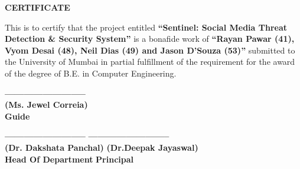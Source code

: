 \newpage
\thispagestyle{plain}
\begin{center}
\textbf {{ \Large CERTIFICATE }} \\
\vspace{2pc}
\end{center}
\doublespacing
{\large
This is to certify that the project entitled \textbf{``Sentinel: Social Media Threat Detection \& Security System''} is a bonafide work of \textbf{``Rayan Pawar (41), Vyom Desai (48), Neil Dias (49) and Jason D'Souza (53)''} submitted to the University of Mumbai in partial fulfillment of the requirement for the award of the degree of B.E. in Computer Engineering.\\
\vspace{3pc}

\begin{center}
\textbf{-------------------------- }
\\
\textbf{(Ms. Jewel Correia)}
\\
\textbf{Guide}
\end{center}

\vspace{6pc}
\begin{flushleft}
\textbf{-------------------------- } \hspace{58.00mm}
\textbf{-------------------------- }
\\
\textbf{(Dr. Dakshata Panchal)} \hspace{54.00mm}\textbf{(Dr.Deepak Jayaswal)}
\\
\textbf{Head Of Department} \hspace{70.00mm}\textbf{ Principal}
\end{flushleft}

}
